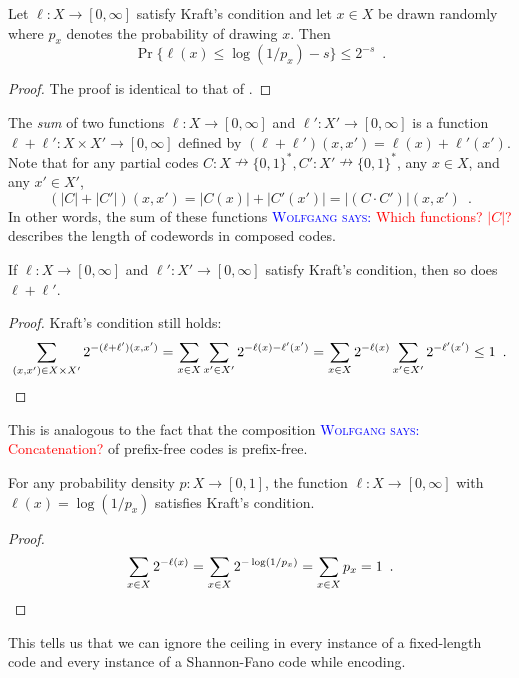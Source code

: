 \documentclass{patmorin}
\newcommand{\aremark}[3]{\textcolor{blue}{\textsc{#1 #2:}}
  \textcolor{red}{\textsf{#3}}}
\newcommand{\wolfgang}[2][says]{\aremark{Wolfgang}{#1}{#2}}
\begin{document}
\begin{lem}
  Let $\ell : X \to [0, \infty]$ satisfy Kraft's condition and let
  $x\in X$ be drawn randomly where $p_x$ denotes the probability of
  drawing $x$.  Then
  \[
    \Pr\{ \ell(x) \le \log(1/p_x)-s\} \le 2^{-s} \enspace .
  \]
\end{lem}
\begin{proof}
  The proof is identical to that of .
\end{proof}

The \emph{sum} of two functions $\ell : X \to [0, \infty]$ and
$\ell' : X' \to [0, \infty]$ is a function
$\ell + \ell' : X \times X' \to [0, \infty]$ defined by
$(\ell + \ell') (x, x') = \ell(x) + \ell'(x')$. Note that for any
partial codes
$C : X \nrightarrow \{0, 1\}^*, C' : X' \nrightarrow \{0, 1\}^*$, any
$x \in X$, and any $x' \in X'$,
\[
(|C| + |C'|)(x, x') = |C(x)| + |C'(x')| = |(C \cdot C')|(x, x') \enspace .
\]
In other words, the sum of these functions 
\wolfgang{Which functions? $|C|$?}describes the length of
codewords in composed codes.

\begin{lem}
  If $\ell : X \to [0, \infty]$ and $\ell' : X' \to [0,
  \infty]$ satisfy Kraft's condition, then so does $\ell + \ell'$.
\end{lem}
\begin{proof}
  Kraft's condition still holds:
  \[
  \sum_{(x, x') \in X \times X'} 2^{-(\ell + \ell')(x, x')} = \sum_{x
    \in X} \sum_{x' \in X'} 2^{-\ell(x) - \ell'(x')} = \sum_{x \in X}
  2^{-\ell(x)} \sum_{x' \in X'} 2^{-\ell'(x')} \leq 1 \enspace
  . \qedhere
  \]
\end{proof}
This is analogous to the fact that the composition
\wolfgang{Concatenation?} of prefix-free
codes is prefix-free.

\begin{lem}
  For any probability density $p : X \to [0, 1]$, the function
  $\ell : X \to [0, \infty]$ with $\ell(x) = \log (1/p_x)$
  satisfies Kraft's condition.
\end{lem}
\begin{proof}
  \[
  \sum_{x \in X} 2^{-\ell(x)} = \sum_{x \in X} 2^{-\log (1/p_x)} =
  \sum_{x \in X} p_x = 1 \enspace . \qedhere
  \]
\end{proof}
This tells us that we can ignore the ceiling in every instance of a
fixed-length code and every instance of a Shannon-Fano code while
encoding.
\end{document}
